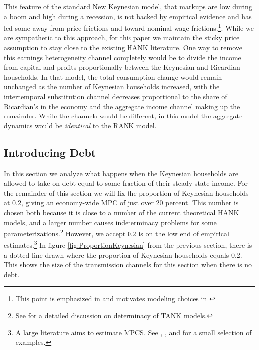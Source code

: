 \documentclass[titlepage]{\econtex}\newcommand{\texname}{ConsumptionHeterogeneity}
\begin{document}
This feature of the standard New Keynesian model, that markups are low during a boom and high during a recession, is not backed by empirical evidence and has led some away from price frictions and toward nominal wage frictions.\footnote{This point is emphasized in \cite{broer_2018} and motivates modeling choices in \cite{auclert_inequality_2018}}. While we are sympathetic to this approach, for this paper we maintain the sticky price assumption to stay close to the existing HANK literature. One way to remove this earnings heterogeneity channel completely would be to divide the income from capital and profits proportionally between the Keynesian and Ricardian households. In that model, the total consumption change would remain unchanged as the number of Keynesian households increased, with the intertemporal substitution channel decreases proportional to the share of Ricardian's in the economy and the aggregate income channel making up the remainder. While the channels would be different, in this model the aggregate dynamics would be \textit{identical} to the RANK model.

\subsection{Introducing Debt}
In this section we analyze what happens when the Keynesian households are allowed to take on debt equal to some fraction of their steady state income. For the remainder of this section we will fix the proportion of Keynesian households at 0.2, giving an economy-wide MPC of just over 20 percent. This number is chosen both because it is close to a number of the current theoretical HANK models, and a larger number causes indeterminacy problems for some parameterizations.\footnote{See \cite{gali_2004} for a detailed discussion on determinacy of TANK models.} However, we accept 0.2 is on the low end of empirical estimates.\footnote{A large literature aims to estimate MPCS. See \cite{johnson_household_2006}, \cite{parker_consumer_2013}, \cite{fagereng_mpc_2016} and \cite{ckConsumption} for a small selection of examples.} In figure \ref{fig:ProportionKeynesian} from the previous section, there is a dotted line drawn where the proportion of Keynesian households equals 0.2. This shows the size of the transmission channels for this section when there is no debt.
\end{document}
